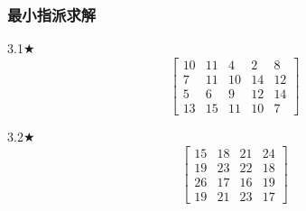 \subsubsection{最小指派求解}

\begin{problem}{3.1$\bigstar$}
        $$\begin{bmatrix}
        10 & 11 & 4 & 2 & 8\\
        7 & 11 & 10 & 14 & 12\\
        5 & 6 & 9 & 12 & 14\\
        13 & 15 & 11 & 10 & 7
    \end{bmatrix}$$
\end{problem}

\begin{problem}{3.2$\bigstar$}
    $$\begin{bmatrix}
        15 & 18 & 21 & 24\\
        19 & 23 & 22 & 18\\
        26 & 17 & 16 & 19\\
        19 & 21 & 23 & 17
    \end{bmatrix}$$
\end{problem}